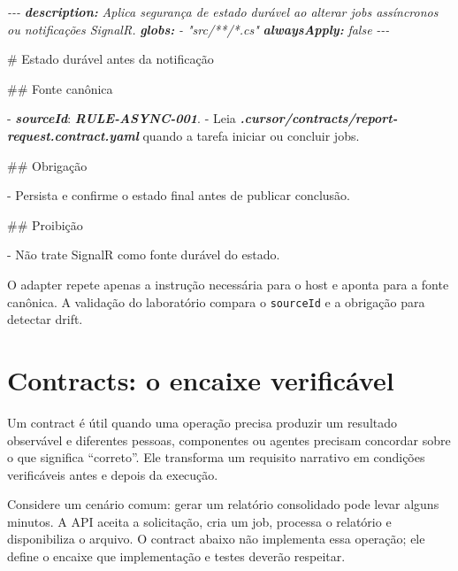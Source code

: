\documentclass[
  10pt,
  a4paper,
  oneside]{book}
\newenvironment{Shaded}{}{}
\newcommand{\AnnotationTok}[1]{\textcolor[rgb]{0.38,0.63,0.69}{\textbf{\textit{#1}}}}
\newcommand{\CommentTok}[1]{\textcolor[rgb]{0.38,0.63,0.69}{\textit{#1}}}
\newcommand{\FunctionTok}[1]{\textcolor[rgb]{0.02,0.16,0.49}{#1}}
\newcommand{\InformationTok}[1]{\textcolor[rgb]{0.38,0.63,0.69}{\textbf{\textit{#1}}}}
\newcommand{\NormalTok}[1]{#1}
\newcommand{\SpecialStringTok}[1]{\textcolor[rgb]{0.73,0.40,0.53}{#1}}
\begin{document}
\begin{Shaded}
\begin{Highlighting}[]
\CommentTok{{-}{-}{-}}
\AnnotationTok{description:}\CommentTok{ Aplica segurança de estado durável ao alterar jobs assíncronos ou notificações SignalR.}
\AnnotationTok{globs:}
\CommentTok{  {-} "src/**/*.cs"}
\AnnotationTok{alwaysApply:}\CommentTok{ false}
\CommentTok{{-}{-}{-}}

\FunctionTok{\# Estado durável antes da notificação}

\FunctionTok{\#\# Fonte canônica}

\SpecialStringTok{{-} }\InformationTok{\textasciigrave{}sourceId\textasciigrave{}}\NormalTok{: }\InformationTok{\textasciigrave{}RULE{-}ASYNC{-}001\textasciigrave{}}\NormalTok{.}
\SpecialStringTok{{-} }\NormalTok{Leia }\InformationTok{\textasciigrave{}.cursor/contracts/report{-}request.contract.yaml\textasciigrave{}}\NormalTok{ quando a tarefa iniciar ou concluir jobs.}

\FunctionTok{\#\# Obrigação}

\SpecialStringTok{{-} }\NormalTok{Persista e confirme o estado final antes de publicar conclusão.}

\FunctionTok{\#\# Proibição}

\SpecialStringTok{{-} }\NormalTok{Não trate SignalR como fonte durável do estado.}
\end{Highlighting}
\end{Shaded}

O adapter repete apenas a instrução necessária para o host e aponta para
a fonte canônica. A validação do laboratório compara o \texttt{sourceId}
e a obrigação para detectar drift.

\hypertarget{contracts-o-encaixe-verificuxe1vel}{%
\section{Contracts: o encaixe
verificável}\label{contracts-o-encaixe-verificuxe1vel}}

Um contract é útil quando uma operação precisa produzir um resultado
observável e diferentes pessoas, componentes ou agentes precisam
concordar sobre o que significa ``correto''. Ele transforma um requisito
narrativo em condições verificáveis antes e depois da execução.

Considere um cenário comum: gerar um relatório consolidado pode levar
alguns minutos. A API aceita a solicitação, cria um job, processa o
relatório e disponibiliza o arquivo. O contract abaixo não implementa
essa operação; ele define o encaixe que implementação e testes deverão
respeitar.
\end{document}

